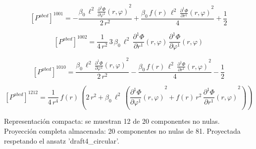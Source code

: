 \documentclass[11pt]{article}
\begin{document}
\begin{dmath*}[breakdepth={5}]
\left[P^{abcd}\right]^{1001} = -\frac{\beta_{0}\,{\ell}^{2}\,{\frac{\partial^{1} \Phi}{\partial \varphi^{1}}\!\left(r, \varphi\right)}^{2}}{2\,{r}^{2}} + \frac{\beta_{0}\,f\!\left(r\right)\,{\ell}^{2}\,{\frac{\partial^{1} \Phi}{\partial r^{1}}\!\left(r, \varphi\right)}^{2}}{4} + \frac{1}{2}
\end{dmath*}
\par\smallskip
\begin{dmath*}[breakdepth={5}]
\left[P^{abcd}\right]^{1002} = \frac{1}{4\,{r}^{2}}\,3\,\beta_{0}\,{\ell}^{2}\,\frac{\partial^{1} \Phi}{\partial r^{1}}\!\left(r, \varphi\right)\,\frac{\partial^{1} \Phi}{\partial \varphi^{1}}\!\left(r, \varphi\right)
\end{dmath*}
\par\smallskip
\begin{dmath*}[breakdepth={5}]
\left[P^{abcd}\right]^{1010} = \frac{\beta_{0}\,{\ell}^{2}\,{\frac{\partial^{1} \Phi}{\partial \varphi^{1}}\!\left(r, \varphi\right)}^{2}}{2\,{r}^{2}} - \frac{\beta_{0}\,f\!\left(r\right)\,{\ell}^{2}\,{\frac{\partial^{1} \Phi}{\partial r^{1}}\!\left(r, \varphi\right)}^{2}}{4} - \frac{1}{2}
\end{dmath*}
\par\smallskip
\begin{dmath*}[breakdepth={5}]
\left[P^{abcd}\right]^{1212} = \frac{1}{4\,{r}^{4}}\,f\!\left(r\right)\,\left(2\,{r}^{2} + \beta_{0}\,{\ell}^{2}\,\left({\frac{\partial^{1} \Phi}{\partial \varphi^{1}}\!\left(r, \varphi\right)}^{2} + f\!\left(r\right)\,{r}^{2}\,{\frac{\partial^{1} \Phi}{\partial r^{1}}\!\left(r, \varphi\right)}^{2}\right)\right)
\end{dmath*}
\par\smallskip
Representación compacta: se muestran 12 de 20 componentes no nulas.
Proyección completa almacenada: 20 componentes no nulas de 81. Proyectada respetando el ansatz 'draft4\_circular'.\par\medskip
{}
\end{document}
